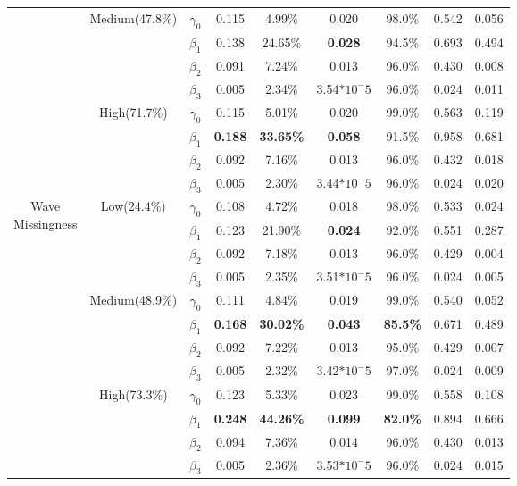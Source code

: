 \documentclass{svjour3}                     %
\begin{document}
\begin{table}[p]
\begin{tabular}{c|c|c|cccccc}
		&\multirow{4}{*}{Medium(47.8\%)}
		& $\gamma_0$ & 0.115 & 4.99\% & 0.020 & 98.0\% & 0.542 & 0.056 \\
		&& $\beta_1$ & 0.138 & 24.65\% & \textbf{0.028} & 94.5\% & 0.693 & 0.494 \\
		&& $\beta_2$ & 0.091 & 7.24\% & 0.013 & 96.0\% & 0.430 & 0.008 \\
		&& $\beta_3$ & 0.005 & 2.34\% & 3.54$*10^-5$ & 96.0\% & 0.024 & 0.011 \\ \cline{2-9} \noalign{\smallskip}
		& \multirow{4}{*}{High(71.7\%)}
		& $\gamma_0$ & 0.115 & 5.01\% & 0.020 & 99.0\% & 0.563 & 0.119 \\
		&& $\beta_1$ & \textbf{0.188} & \textbf{33.65\%} & \textbf{0.058} & 91.5\% & 0.958 & 0.681 \\
		&& $\beta_2$ & 0.092 & 7.16\% & 0.013 & 96.0\% & 0.432 & 0.018 \\
		&& $\beta_3$ & 0.005 & 2.30\% & 3.44$*10^-5$ & 96.0\% & 0.024 & 0.020 \\
		\midrule
		\midrule
		\multirow{12}{*}{\parbox{1.75cm}{Wave \\ Missingness}}
		& \multirow{4}{*}{Low(24.4\%)}
		& $\gamma_0$ & 0.108 & 4.72\% & 0.018 & 98.0\% & 0.533 & 0.024 \\
		&& $\beta_1$ & 0.123 & 21.90\% & \textbf{0.024} & 92.0\% & 0.551 & 0.287 \\
		&& $\beta_2$ & 0.092 & 7.18\% & 0.013 & 96.0\% & 0.429 & 0.004 \\
		&& $\beta_3$ & 0.005 & 2.35\% & 3.51$*10^-5$ & 96.0\% & 0.024 & 0.005 \\ \cline{2-9} \noalign{\smallskip}
		&\multirow{4}{*}{Medium(48.9\%)}
		& $\gamma_0$ & 0.111 & 4.84\% & 0.019 & 99.0\% & 0.540 & 0.052 \\
		&& $\beta_1$ & \textbf{0.168} & \textbf{30.02\%} & \textbf{0.043} & \textbf{85.5\%} & 0.671 & 0.489 \\
		&& $\beta_2$ & 0.092 & 7.22\% & 0.013 & 95.0\% & 0.429 & 0.007 \\
		&& $\beta_3$ & 0.005 & 2.32\% & 3.42$*10^-5$ & 97.0\% & 0.024 & 0.009 \\ \cline{2-9} \noalign{\smallskip}
		& \multirow{4}{*}{High(73.3\%)}
		& $\gamma_0$ & 0.123 & 5.33\% & 0.023 & 99.0\% & 0.558 & 0.108 \\
		&& $\beta_1$ & \textbf{0.248} & \textbf{44.26\%} & \textbf{0.099} & \textbf{82.0\%} & 0.894 & 0.666 \\
		&& $\beta_2$ & 0.094 & 7.36\% & 0.014 & 96.0\% & 0.430 & 0.013 \\
		&& $\beta_3$ & 0.005 & 2.36\% & 3.53$*10^-5$ & 96.0\% & 0.024 & 0.015 \\
		\bottomrule
	\end{tabular}	
\end{table}
\end{document}
